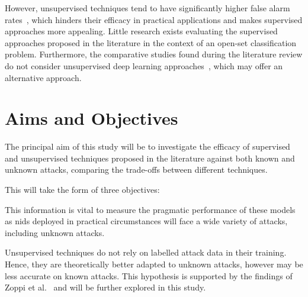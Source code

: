 However, unsupervised techniques tend to have significantly higher false alarm
rates~\cite{Zoppi}, which hinders their efficacy in practical applications and
makes supervised approaches more appealing. Little research exists evaluating
the supervised approaches proposed in the literature in the context of an
open-set classification problem. Furthermore, the comparative studies found
during the literature review do not consider unsupervised deep learning
approaches~\cite{Kus, Zoppi}, which may offer an alternative approach.

\section{Aims and Objectives}%
\label{sec:aims}

The principal aim of this study will be to investigate the efficacy of
supervised and unsupervised techniques proposed in the literature against both
known and unknown attacks, comparing the trade-offs between different
techniques.

This will take the form of three objectives:

\hypertarget{obj}{}

\begin{center}
\end{center}

This information is vital to measure the pragmatic performance of these models
as \gls{nids} deployed in practical circumstances will face a wide variety of
attacks, including unknown attacks.

\begin{center}
\end{center}

Unsupervised techniques do not rely on labelled attack data in their training.
Hence, they are theoretically better adapted to unknown attacks, however may be
less accurate on known attacks. This hypothesis is supported by the findings of
Zoppi et al.~\cite{Zoppi} and will be further explored in this study.

